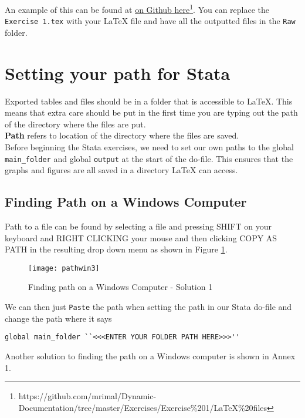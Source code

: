 \documentclass[]{article}
\begin{document}
An example of this can be found at \href{https://github.com/mrimal/Dynamic-Documentation/tree/master/Exercises/Exercise\%201/LaTeX\%20files}{on Github here}\footnote{https://github.com/mrimal/Dynamic-Documentation/tree/master/Exercises/Exercise\%201/LaTeX\%20files}. You can replace the \texttt{Exercise 1.tex} with your {\LaTeX} file and have all the outputted files in the \texttt{Raw} folder. 

\section*{Setting your path for Stata}
Exported tables and files should be in a folder that is accessible to {\LaTeX}. This means that extra care should be put in the first time you are typing out the path of the directory where the files are put. \\
\textbf{Path} refers to location of the directory where the files are saved. \\

Before beginning the Stata exercises, we need to set our own paths to the global \texttt{main\_folder} and global \texttt{output} at the start of the do-file. This ensures that the graphs and figures are all saved in a directory {\LaTeX} can access. 

\subsection*{Finding Path on a Windows Computer}

Path to a file can be found by selecting a file and pressing {\color{red}SHIFT on your keyboard and RIGHT CLICKING your mouse and then clicking COPY AS PATH in the resulting drop down menu} as shown in Figure \ref{fig:pathwin3}.

\begin{figure}[H]
	\centering
	\texttt{[image: pathwin3]}
	\caption{Finding path on a Windows Computer - Solution 1}
	\label{fig:pathwin3}
\end{figure}

We can then just \texttt{Paste} the path when setting the path in our Stata do-file and change the path where it says
	 \begin{verbatim}
global main_folder ``<<<ENTER YOUR FOLDER PATH HERE>>>''
\end{verbatim} 

Another solution to finding the path on a Windows computer is shown in Annex 1.
	
\end{document}
